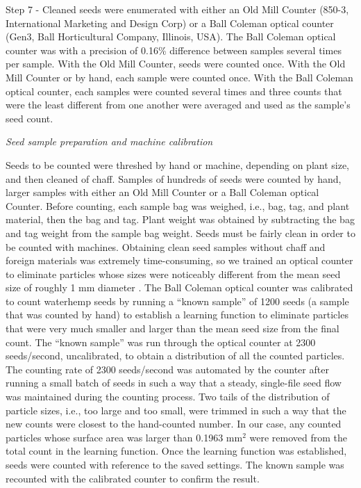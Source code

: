 \documentclass[
]{article}
\begin{document}
Step 7 - Cleaned seeds were enumerated with either an Old Mill Counter (850-3, International Marketing and Design Corp) or a Ball Coleman optical counter (Gen3, Ball Horticultural Company, Illinois, USA). The Ball Coleman optical counter was with a precision of 0.16\% difference between samples several times per sample. With the Old Mill Counter, seeds were counted once. With the Old Mill Counter or by hand, each sample were counted once. With the Ball Coleman optical counter, each samples were counted several times and three counts that were the least different from one another were averaged and used as the sample's seed count.

\emph{Seed sample preparation and machine calibration}

Seeds to be counted were threshed by hand or machine, depending on plant size, and then cleaned of chaff.
Samples of hundreds of seeds were counted by hand, larger samples with either an Old Mill Counter or a Ball Coleman optical Counter. Before counting, each sample bag was weighed, i.e., bag, tag, and plant material, then the bag and tag.
Plant weight was obtained by subtracting the bag and tag weight from the sample bag weight.
Seeds must be fairly clean in order to be counted with machines.
Obtaining clean seed samples without chaff and foreign materials was extremely time-consuming, so we trained an optical counter to eliminate particles whose sizes were noticeably different from the mean seed size of roughly 1 mm diameter \citep{bellTimeRequirementPollination2010}.
The Ball Coleman optical counter was calibrated to count waterhemp seeds by running a ``known sample'' of 1200 seeds (a sample that was counted by hand) to establish a learning function to eliminate particles that were very much smaller and larger than the mean seed size from the final count.
The ``known sample'' was run through the optical counter at 2300 seeds/second, uncalibrated, to obtain a distribution of all the counted particles.
The counting rate of 2300 seeds/second was automated by the counter after running a small batch of seeds in such a way that a steady, single-file seed flow was maintained during the counting process.
Two tails of the distribution of particle sizes, i.e., too large and too small, were trimmed in such a way that the new counts were closest to the hand-counted number.
In our case, any counted particles whose surface area was larger than 0.1963 mm\(^2\) were removed from the total count in the learning function.
Once the learning function was established, seeds were counted with reference to the saved settings.
The known sample was recounted with the calibrated counter to confirm the result.
\end{document}
